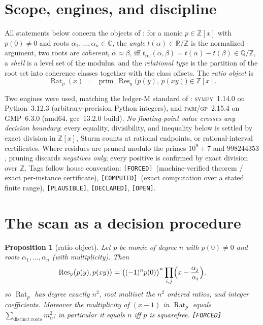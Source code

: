 \documentclass[11pt]{article}
\newcommand{\F}{\textnormal{\texttt{[FORCED]}}}
\newcommand{\C}{\textnormal{\texttt{[COMPUTED]}}}
\newcommand{\Pl}{\textnormal{\texttt{[PLAUSIBLE]}}}
\newcommand{\Dc}{\textnormal{\texttt{[DECLARED]}}}
\newcommand{\Op}{\textnormal{\texttt{[OPEN]}}}
\newcommand{\Q}{\mathbb{Q}}
\newcommand{\Z}{\mathbb{Z}}
\newcommand{\R}{\mathbb{R}}
\newcommand{\Rat}{\operatorname{Rat}}
\newcommand{\Res}{\operatorname{Res}}
\newcommand{\gp}{\textsc{pari/gp}}
\newcommand{\sy}{\textsc{sympy}}
\newtheorem{proposition}[theorem]{Proposition}
\theoremstyle{definition}
\begin{document}
\section{Scope, engines, and discipline}\label{sec:scope}

All statements below concern the objects of \cite{relcharge}: for a monic
$p\in\Z[x]$ with $p(0)\neq 0$ and roots $\alpha_1,\dots,\alpha_n\in\mathbb{C}$,
the \emph{angle} $t(\alpha)\in\R/\Z$ is the normalized argument, two roots are
\emph{coherent}, $\alpha\approx\beta$, iff
$t_{\mathrm{rel}}(\alpha,\beta)=t(\alpha)-t(\beta)\in\Q/\Z$, a \emph{shell} is a
level set of the modulus, and the \emph{relational type} is the partition of the
root set into coherence classes together with the class offsets. The
\emph{ratio object} is
\[
\Rat_p(x)\;=\;\operatorname{prim}\,\Res_y\bigl(p(y),\,p(xy)\bigr)\in\Z[x].
\]

Two engines were used, matching the ledger-M standard of \cite{relcharge}:
\sy~1.14.0 on Python~3.12.3 (arbitrary-precision Python integers), and
\gp~2.15.4 on GMP~6.3.0 (amd64, gcc~13.2.0 build). \emph{No floating-point value
crosses any decision boundary}: every equality, divisibility, and inequality
below is settled by exact division in $\Z[x]$, Sturm counts at rational
endpoints, or rational-interval certificates. Where residues are pruned modulo
the primes $10^9{+}7$ and $998244353$, pruning discards \emph{negatives only};
every positive is confirmed by exact division over $\Z$. Tags follow house
convention: \F\ (machine-verified theorem / exact per-instance certificate),
\C\ (exact computation over a stated finite range), \Pl, \Dc, \Op.

\section{The scan as a decision procedure}\label{sec:scan}

\begin{proposition}[ratio object]\label{prop:rat}
Let $p$ be monic of degree $n$ with $p(0)\neq0$ and roots $\alpha_1,\dots,\alpha_n$
(with multiplicity). Then
\[
\Res_y\bigl(p(y),p(xy)\bigr)
=\bigl((-1)^n p(0)\bigr)^{n}\prod_{i,j}\Bigl(x-\frac{\alpha_j}{\alpha_i}\Bigr),
\]
so $\Rat_p$ has degree exactly $n^2$, root multiset the $n^2$ ordered ratios,
and integer coefficients. Moreover the multiplicity of $(x-1)$ in $\Rat_p$
equals $\sum_{\text{distinct roots}}m_\alpha^{2}$; in particular it equals $n$
iff $p$ is squarefree. \F
\end{proposition}
\end{document}
